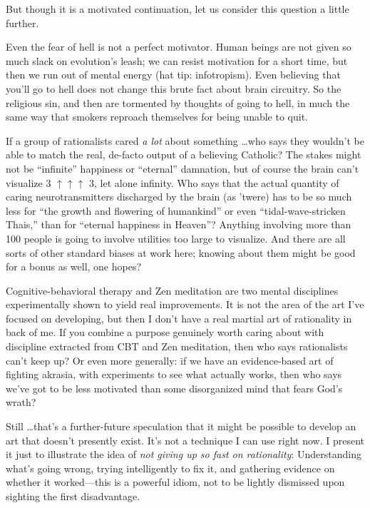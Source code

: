 {
 But though it is a motivated continuation, let us consider this
question a little further.}

{
 Even the fear of hell is not a perfect motivator. Human beings are
not given so much slack on evolution's leash; we can
resist motivation for a short time, but then we run out of mental
energy (hat tip: infotropism). Even believing that
you'll go to hell does not change this brute fact about
brain circuitry. So the religious sin, and then are tormented by
thoughts of going to hell, in much the same way that smokers reproach
themselves for being unable to quit.}

{
 If a group of rationalists cared \textit{a lot} about something
\ldots who says they wouldn't be able to match the real,
de-facto output of a believing Catholic? The stakes might not be
``infinite'' happiness or
``eternal'' damnation, but of course
the brain can't visualize 3 $\uparrow \uparrow \uparrow
$ 3, let alone infinity. Who says that the actual quantity of caring
neurotransmitters discharged by the brain (as 'twere)
has to be so much less for ``the growth and flowering
of humankind'' or even
``tidal-wave-stricken Thais,'' than
for ``eternal happiness in Heaven''?
Anything involving more than 100 people is going to involve utilities
too large to visualize. And there are all sorts of other standard
biases at work here; knowing about them might be good for a bonus as
well, one hopes?}

{
 Cognitive-behavioral therapy and Zen meditation are two mental
disciplines experimentally shown to yield real improvements. It is not
the area of the art I've focused on developing, but
then I don't have a real martial art of rationality in
back of me. If you combine a purpose genuinely worth caring about with
discipline extracted from CBT and Zen meditation, then who says
rationalists can't keep up? Or even more generally: if
we have an evidence-based art of fighting akrasia, with experiments to
see what actually works, then who says we've got to be
less motivated than some disorganized mind that fears
God's wrath?}

{
 Still \ldots that's a further-future speculation
that it might be possible to develop an art that
doesn't presently exist. It's not a
technique I can use right now. I present it just to illustrate the idea
of \textit{not giving up so fast on rationality}: Understanding
what's going wrong, trying intelligently to fix it, and
gathering evidence on whether it worked---this is a powerful idiom, not
to be lightly dismissed upon sighting the first disadvantage.}

